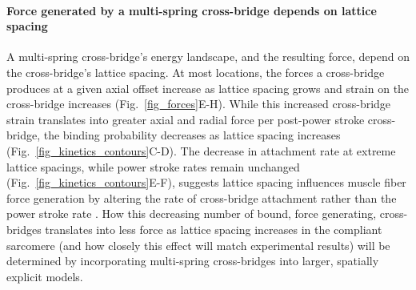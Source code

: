 \documentclass[11pt,titlepage]{article}
\begin{document}
\paragraph{Force generated by a multi-spring cross-bridge depends on lattice spacing} %
A multi-spring cross-bridge's energy landscape, and the resulting force, depend on the cross-bridge's lattice spacing.
At most locations, the forces a cross-bridge produces at a given axial offset increase as lattice spacing grows and strain on the cross-bridge increases (Fig.~\ref{fig_forces}E-H). 
While this increased cross-bridge strain translates into greater axial and radial force per post-power stroke cross-bridge, the binding probability decreases as lattice spacing increases (Fig.~\ref{fig_kinetics_contours}C-D).
The decrease in attachment rate at extreme lattice spacings, while power stroke rates remain unchanged (Fig.~\ref{fig_kinetics_contours}E-F), suggests lattice spacing influences muscle fiber force generation by altering the rate of cross-bridge attachment rather than the power stroke rate \citep{Martyn2004}. 
How this decreasing number of bound, force generating, cross-bridges translates into less force as lattice spacing increases in the compliant sarcomere (and how closely this effect will match experimental results) will be determined by incorporating multi-spring cross-bridges into larger, spatially explicit models. 
\end{document}
